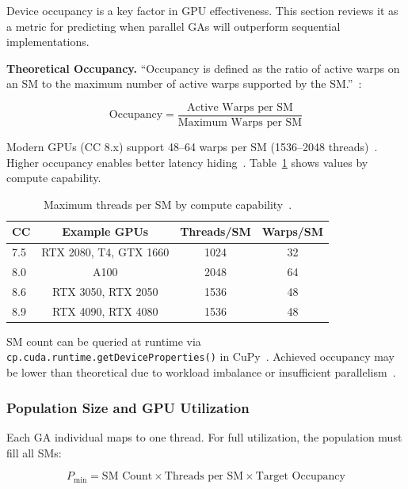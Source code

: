 \documentclass[a4paper,14pt]{extarticle}
\begin{document}

Device occupancy is a key factor in GPU effectiveness. This section reviews it as a metric for predicting when parallel GAs will outperform sequential implementations.

\textbf{Theoretical Occupancy.} ``Occupancy is defined as the ratio of active warps on an SM to the maximum number of active warps supported by the SM.''~\cite{nvidia2024occupancy}:

\begin{equation}
\text{Occupancy} = \frac{\text{Active Warps per SM}}{\text{Maximum Warps per SM}}
\label{eq:occupancy}
\end{equation}

Modern GPUs (CC 8.x) support 48--64 warps per SM (1536--2048 threads)~\cite{jia2018volta}. Higher occupancy enables better latency hiding~\cite{volkov2010occupancy}. Table~\ref{tab:threads_per_sm} shows values by compute capability.

\begin{table}[H]
\centering
\small
\begin{tabular}{@{}lccc@{}}
\toprule
\textbf{CC} & \textbf{Example GPUs} & \textbf{Threads/SM} & \textbf{Warps/SM} \\
\midrule
7.5 & RTX 2080, T4, GTX 1660 & 1024 & 32 \\
8.0 & A100 & 2048 & 64 \\
8.6 & RTX 3050, RTX 2050 & 1536 & 48 \\
8.9 & RTX 4090, RTX 4080 & 1536 & 48 \\
\bottomrule
\end{tabular}
\caption{Maximum threads per SM by compute capability~\cite{nvidia2024programming}.}
\label{tab:threads_per_sm}
\end{table}

SM count can be queried at runtime via \texttt{cp.cuda.runtime.getDeviceProperties()} in CuPy~\cite{cupy_docs}. Achieved occupancy may be lower than theoretical due to workload imbalance or insufficient parallelism~\cite{nvidia2024occupancy}.

\subsubsection*{Population Size and GPU Utilization}

Each GA individual maps to one thread. For full utilization, the population must fill all SMs:

\begin{equation}
P_{\min} = \text{SM Count} \times \text{Threads per SM} \times \text{Target Occupancy}
\label{eq:pmin}
\end{equation}
\end{document}
